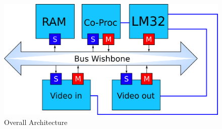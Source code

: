 \begin{figure}[h]
	\center
	\includegraphics[width=15cm]{figs/overall_arch.pdf}

	\caption{Overall Architecture}
	\label{archi}
\end{figure}
